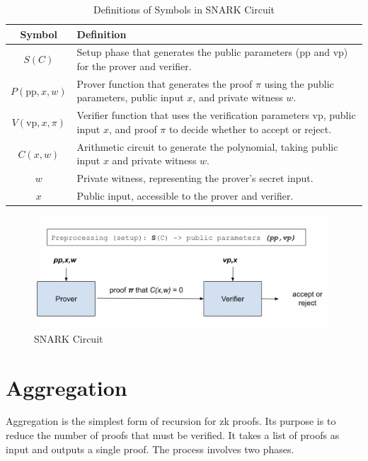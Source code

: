 \begin{table}[H]
   \centering
   \caption{Definitions of Symbols in SNARK Circuit}
   \label{tab:snark_symbols}
   \begin{tabular}{|c|p{12cm}|}
   \hline
   \textbf{Symbol} & \textbf{Definition} \\ \hline
   \( S(C) \) & Setup phase that generates the public parameters (\( \text{pp} \) and \( \text{vp} \)) for the prover and verifier. \\ \hline
   \( P(\text{pp}, x, w) \) & Prover function that generates the proof \( \pi \) using the public parameters, public input \( x \), and private witness \( w \). \\ \hline
   \( V(\text{vp}, x, \pi) \) & Verifier function that uses the verification parameters \( \text{vp} \), public input \( x \), and proof \( \pi \) to decide whether to accept or reject. \\ \hline
   \( C(x, w) \) & Arithmetic circuit to generate the polynomial, taking public input \( x \) and private witness \( w \). \\ \hline
   \( w \) & Private witness, representing the prover's secret input. \\ \hline
   \( x \) & Public input, accessible to the prover and verifier. \\ \hline
   \end{tabular}
   \end{table}
   

\begin{figure}[H]
\centering
\includegraphics[width=130mm]{SNARKCircuit.png}
\caption{SNARK Circuit \cite{ZKM2}}
\label{overflow}
\end{figure}



\section{Aggregation}
 Aggregation is the simplest form of recursion for zk proofs. Its purpose is to reduce the number of proofs that must be verified. 
 It takes a list of proofs as input and outputs a single proof.
 The process involves two phases.
 
